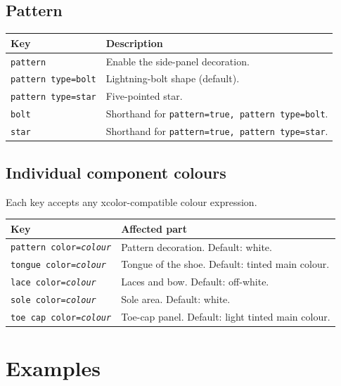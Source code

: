\documentclass[a4paper, 11pt]{article}
\newcommand{\meta}[1]{\textlangle\textit{#1}\textrangle}
\begin{document}
	\subsection{Pattern}
	
	\begin{tabular}{@{}lp{8.5cm}@{}}
		\toprule
		Key & Description \\
		\midrule
		\texttt{pattern}               & Enable the side-panel decoration. \\
		\texttt{pattern type=bolt}     & Lightning-bolt shape (default). \\
		\texttt{pattern type=star}     & Five-pointed star. \\
		\texttt{bolt}                  & Shorthand for \texttt{pattern=true, pattern type=bolt}. \\
		\texttt{star}                  & Shorthand for \texttt{pattern=true, pattern type=star}. \\
		\bottomrule
	\end{tabular}
	
	\subsection{Individual component colours}
	
	Each key accepts any \textsf{xcolor}-compatible colour expression.
	
	\begin{tabular}{@{}lp{8.5cm}@{}}
		\toprule
		Key & Affected part \\
		\midrule
		\texttt{pattern color=\meta{colour}} & Pattern decoration. Default: white. \\
		\texttt{tongue color=\meta{colour}}  & Tongue of the shoe. Default: tinted main colour. \\
		\texttt{lace color=\meta{colour}}    & Laces and bow. Default: off-white. \\
		\texttt{sole color=\meta{colour}}    & Sole area. Default: white. \\
		\texttt{toe cap color=\meta{colour}} & Toe-cap panel. Default: light tinted main colour. \\
		\bottomrule
	\end{tabular}
	
	\section{Examples}
	
\end{document}
